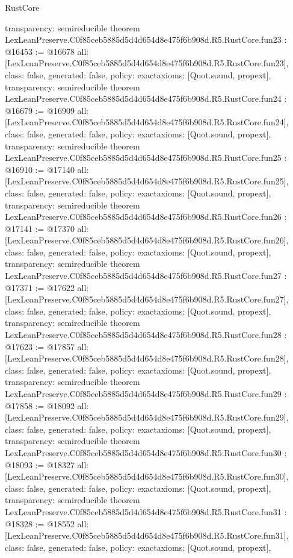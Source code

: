 \begin{lexlean}{RustCore}
\begin{coremodule}
{  transparency: semireducible
}
theorem LexLeanPreserve.C0f85ceb5885d5d4d654d8e475f6b908d.R5.RustCore.fun23 : @16453 := @16678 {
  all: [LexLeanPreserve.C0f85ceb5885d5d4d654d8e475f6b908d.R5.RustCore.fun23],
  class: false,
  generated: false,
  policy: exact{axioms: [Quot.sound, propext]},
  transparency: semireducible
}
theorem LexLeanPreserve.C0f85ceb5885d5d4d654d8e475f6b908d.R5.RustCore.fun24 : @16679 := @16909 {
  all: [LexLeanPreserve.C0f85ceb5885d5d4d654d8e475f6b908d.R5.RustCore.fun24],
  class: false,
  generated: false,
  policy: exact{axioms: [Quot.sound, propext]},
  transparency: semireducible
}
theorem LexLeanPreserve.C0f85ceb5885d5d4d654d8e475f6b908d.R5.RustCore.fun25 : @16910 := @17140 {
  all: [LexLeanPreserve.C0f85ceb5885d5d4d654d8e475f6b908d.R5.RustCore.fun25],
  class: false,
  generated: false,
  policy: exact{axioms: [Quot.sound, propext]},
  transparency: semireducible
}
theorem LexLeanPreserve.C0f85ceb5885d5d4d654d8e475f6b908d.R5.RustCore.fun26 : @17141 := @17370 {
  all: [LexLeanPreserve.C0f85ceb5885d5d4d654d8e475f6b908d.R5.RustCore.fun26],
  class: false,
  generated: false,
  policy: exact{axioms: [Quot.sound, propext]},
  transparency: semireducible
}
theorem LexLeanPreserve.C0f85ceb5885d5d4d654d8e475f6b908d.R5.RustCore.fun27 : @17371 := @17622 {
  all: [LexLeanPreserve.C0f85ceb5885d5d4d654d8e475f6b908d.R5.RustCore.fun27],
  class: false,
  generated: false,
  policy: exact{axioms: [Quot.sound, propext]},
  transparency: semireducible
}
theorem LexLeanPreserve.C0f85ceb5885d5d4d654d8e475f6b908d.R5.RustCore.fun28 : @17623 := @17857 {
  all: [LexLeanPreserve.C0f85ceb5885d5d4d654d8e475f6b908d.R5.RustCore.fun28],
  class: false,
  generated: false,
  policy: exact{axioms: [Quot.sound, propext]},
  transparency: semireducible
}
theorem LexLeanPreserve.C0f85ceb5885d5d4d654d8e475f6b908d.R5.RustCore.fun29 : @17858 := @18092 {
  all: [LexLeanPreserve.C0f85ceb5885d5d4d654d8e475f6b908d.R5.RustCore.fun29],
  class: false,
  generated: false,
  policy: exact{axioms: [Quot.sound, propext]},
  transparency: semireducible
}
theorem LexLeanPreserve.C0f85ceb5885d5d4d654d8e475f6b908d.R5.RustCore.fun30 : @18093 := @18327 {
  all: [LexLeanPreserve.C0f85ceb5885d5d4d654d8e475f6b908d.R5.RustCore.fun30],
  class: false,
  generated: false,
  policy: exact{axioms: [Quot.sound, propext]},
  transparency: semireducible
}
theorem LexLeanPreserve.C0f85ceb5885d5d4d654d8e475f6b908d.R5.RustCore.fun31 : @18328 := @18552 {
  all: [LexLeanPreserve.C0f85ceb5885d5d4d654d8e475f6b908d.R5.RustCore.fun31],
  class: false,
  generated: false,
  policy: exact{axioms: [Quot.sound, propext]},
}
\end{coremodule}
\end{lexlean}
